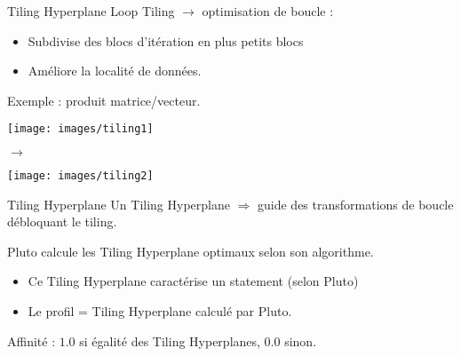 \documentclass[5pt, compress]{beamer}
\begin{document}
    \begin{frame}{Tiling Hyperplane}
        Loop Tiling $\rightarrow$ optimisation de boucle :
        \vspace{-1.2em}
        \begin{itemize}\itemsep0em
            \item Subdivise des blocs d'itération en plus petits blocs
            \item Améliore la localité de données.
        \end{itemize}

        \begin{center}
        Exemple : produit matrice/vecteur.
        \end{center}
        \vspace{-1em}
        \begin{minipage}{0.45\linewidth}
            \center
            \texttt{[image: images/tiling1]}
        \end{minipage}
        \begin{minipage}{0.05\linewidth}
            \center
            $\rightarrow$
        \end{minipage} 
        \begin{minipage}{0.45\linewidth}
            \center
            \texttt{[image: images/tiling2]} 
        \end{minipage}

    \end{frame}
    \begin{frame}{Tiling Hyperplane}
        Un Tiling Hyperplane $\Rightarrow$ guide des transformations de boucle débloquant le tiling.
        \bigskip

        Pluto calcule les Tiling Hyperplane optimaux selon son algorithme.
        \vspace{-1.2em}
        \begin{itemize}\itemsep0em
            \item Ce Tiling Hyperplane caractérise un statement (selon Pluto)
            \item Le profil = Tiling Hyperplane calculé par Pluto.
        \end{itemize}


    Affinité : $1.0$ si égalité des Tiling Hyperplanes, $0.0$ sinon.
    \end{frame}


    
\end{document}

